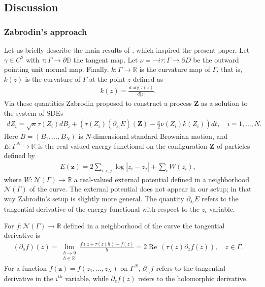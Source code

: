 \documentclass[11pt]{article}
\renewcommand{\Re}{\operatorname{Re}\,}
\newcommand{\R}{\mathbb{R}}
\numberwithin{equation}{section}
\theoremstyle{definition}
\begin{document}
\subsection{Discussion}\label{sect::discussion}
\subsubsection*{Zabrodin's approach}
Let us briefly describe the main results of \cite{zabrodin2023dyson},  which inspired the present paper. Let $\gamma \in C^2$ with $\tau : \Gamma \to \partial \mathbb{D}$ the tangent map. Let $\nu = -i\tau  : \Gamma \to \partial D$ be the outward pointing unit normal map. Finally, $k : \Gamma \to \R$ is the curvature map of $\Gamma$, that is, $k(z)$ is the curvature of $\Gamma$ at the point $z$ defined as
\begin{align}\label{eqn: curvature}
k(z) = \frac{d \arg \tau(z)}{d |z|}.
\end{align}
Via these quantities Zabrodin \cite{zabrodin2023dyson} proposed to construct a process $\boldsymbol{Z}$ as a solution to the system of SDEs
\begin{align}\label{eq: SDE_Zabrodin}
    dZ_{i} = \sqrt{\kappa}\tau(Z_{i})dB_{i} + \left(\tau(Z_{i})(\partial_{s_{i}}E)(\boldsymbol{Z}) - \frac{\kappa}{2}\nu(Z_{i})k(Z_{i})\right)dt, \quad i=1,\ldots,N.
\end{align}
Here $B = (B_1, \ldots, B_N)$ is $N$-dimensional standard Brownian motion, and $E : \Gamma^N \to \R$ is the real-valued energy functional on the configuration $\boldsymbol{Z}$ of particles defined by
\begin{align}\label{eqn: E_functional}
E(\boldsymbol{z})= 2 \sum_{i < j} \log |z_i - z_j| + \sum_i W(z_i),
\end{align}
where $W : \mathcal{N}(\Gamma) \to \R$ a real-valued external potential defined in a neighborhood $\mathcal{N}(\Gamma)$ of the curve. The external potential does not appear in our setup; in that way Zabrodin's setup is slightly more general. The quantity $\partial_{s_i} E$ refers to the tangential derivative of the energy functional with respect to the $z_i$ variable. 

For $f : \mathcal{N}(\Gamma) \to \R$ defined in a neighborhood of the curve the tangential derivative is
\begin{align}\label{eq::tangential_derivative}
    (\partial_{s} f)(z) = \lim_{\substack{h \to 0 \\ h \in \R}} \frac{f(z + \tau(z) h) - f(z)}{h} = 2 \Re \left( \tau(z) \partial_{z} f(z) \right), \quad z \in \Gamma.
\end{align}
For a function $f(\boldsymbol{z})=f(z_{1},\dots,z_{N})$ on $\Gamma^N$, $\partial_{s_{i}}f$ refers to the tangential derivative in the $i^{th}$ variable, while $\partial_z f(z)$ refers to the holomorphic derivative.
\end{document}
